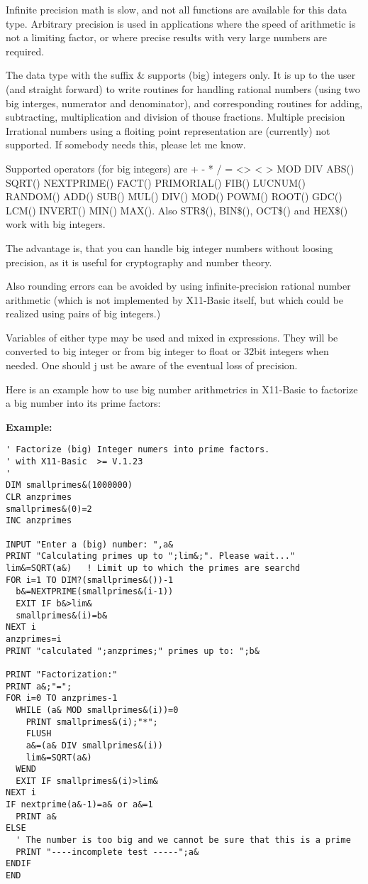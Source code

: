 Infinite precision math is slow, and not all functions are available
for this data type. Arbitrary precision is used in applications where the 
speed of arithmetic is not a limiting factor, or where precise results with 
very large numbers are required.

The data type with the suffix \& supports (big) integers only. It is up to the 
user (and straight forward) to write routines for handling rational numbers 
(using two big interges, numerator and denominator), and corresponding routines for
adding, subtracting, multiplication and division of thouse fractions. Multiple precision 
Irrational numbers using a floiting point representation are (currently) not 
supported. If somebody needs this, please let me know.

Supported operators (for big integers) are + - * / = <> < > MOD DIV ABS() SQRT() 
NEXTPRIME() FACT() PRIMORIAL() FIB()  LUCNUM() RANDOM() ADD() SUB() MUL() DIV() MOD() 
POWM() ROOT() GDC() LCM() INVERT()  MIN() MAX(). 
Also STR\$(), BIN\$(), OCT\$() and HEX\$() work with big integers.

The advantage is, that you can handle big integer numbers without loosing 
precision, as it is useful for cryptography and number theory.

Also rounding errors can be avoided by using infinite-precision rational number
arithmetic (which is not implemented by X11-Basic itself, but which could be realized using pairs of
big integers.)

Variables of either type may be used and mixed in expressions. They will be converted 
to big integer or from big integer to float or 32bit integers when needed. One should j
ust be aware of the eventual loss of precision.

Here is an example how to use big number arithmetrics in X11-Basic to factorize a big
number into its prime factors:

\begin{mdframed}[hidealllines=true,backgroundcolor=blue!20]
 {\bf Example:}
\begin{verbatim}
' Factorize (big) Integer numers into prime factors.
' with X11-Basic  >= V.1.23 
'
DIM smallprimes&(1000000)
CLR anzprimes
smallprimes&(0)=2
INC anzprimes

INPUT "Enter a (big) number: ",a&
PRINT "Calculating primes up to ";lim&;". Please wait..."
lim&=SQRT(a&)   ! Limit up to which the primes are searchd
FOR i=1 TO DIM?(smallprimes&())-1
  b&=NEXTPRIME(smallprimes&(i-1))
  EXIT IF b&>lim&
  smallprimes&(i)=b&
NEXT i
anzprimes=i
PRINT "calculated ";anzprimes;" primes up to: ";b&

PRINT "Factorization:"
PRINT a&;"=";
FOR i=0 TO anzprimes-1
  WHILE (a& MOD smallprimes&(i))=0
    PRINT smallprimes&(i);"*";
    FLUSH
    a&=(a& DIV smallprimes&(i))
    lim&=SQRT(a&)
  WEND
  EXIT IF smallprimes&(i)>lim&
NEXT i
IF nextprime(a&-1)=a& or a&=1
  PRINT a&
ELSE
  ' The number is too big and we cannot be sure that this is a prime
  PRINT "----incomplete test -----";a&
ENDIF
END
\end{verbatim}\end{mdframed}

